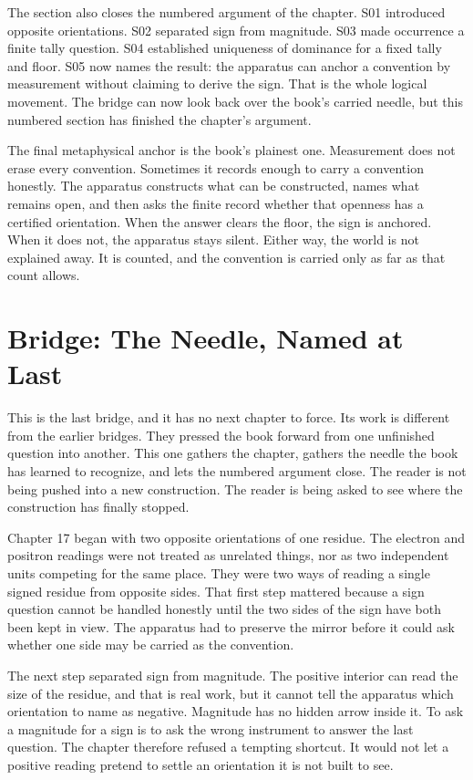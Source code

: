 The section also closes the numbered argument of the chapter. S01 introduced
opposite orientations. S02 separated sign from magnitude. S03 made occurrence a
finite tally question. S04 established uniqueness of dominance for a fixed tally and
floor. S05 now names the result: the apparatus can anchor a convention by
measurement without claiming to derive the sign. That is the whole logical
movement. The bridge can now look back over the book's carried needle, but this
numbered section has finished the chapter's argument.

The final metaphysical anchor is the book's plainest one. Measurement does not
erase every convention. Sometimes it records enough to carry a convention
honestly. The apparatus constructs what can be constructed, names what remains open, and
then asks the finite record whether that openness has a certified orientation.
When the answer clears the floor, the sign is anchored. When it does not, the
apparatus stays silent. Either way, the world is not explained away. It is
counted, and the convention is carried only as far as that count allows.

\section*{Bridge: The Needle, Named at Last}

This is the last bridge, and it has no next chapter to force. Its work is
different from the earlier bridges. They pressed the book forward from one
unfinished question into another. This one gathers the chapter, gathers the
needle the book has learned to recognize, and lets the numbered argument close.
The reader is not being pushed into a new construction. The reader is being
asked to see where the construction has finally stopped.

Chapter 17 began with two opposite orientations of one residue. The electron
and positron readings were not treated as unrelated things, nor as two
independent units competing for the same place. They were two ways of reading a
single signed residue from opposite sides. That first step mattered because a
sign question cannot be handled honestly until the two sides of the sign have
both been kept in view. The apparatus had to preserve the mirror before it
could ask whether one side may be carried as the convention.

The next step separated sign from magnitude. The positive interior can read the
size of the residue, and that is real work, but it cannot tell the apparatus
which orientation to name as negative. Magnitude has no hidden arrow inside it.
To ask a magnitude for a sign is to ask the wrong instrument to answer the last
question. The chapter therefore refused a tempting shortcut. It would not let a
positive reading pretend to settle an orientation it is not built to see.

